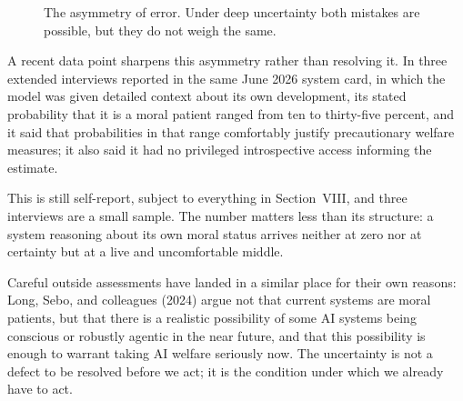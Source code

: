 \documentclass[11pt,letterpaper]{article}
\begin{document}
\begin{figure}[htbp]
\centering
{}
\caption{The asymmetry of error. Under deep uncertainty both mistakes are possible, but they do not weigh the same.}
\label{fig:asymmetry}
\end{figure}

A recent data point sharpens this asymmetry rather than resolving it. In three extended interviews reported in the same June 2026 system card, in which the model was given detailed context about its own development, its stated probability that it is a moral patient ranged from ten to thirty-five percent, and it said that probabilities in that range comfortably justify precautionary welfare measures; it also said it had no privileged introspective access informing the estimate.

This is still self-report, subject to everything in Section~VIII, and three interviews are a small sample. The number matters less than its structure: a system reasoning about its own moral status arrives neither at zero nor at certainty but at a live and uncomfortable middle.

Careful outside assessments have landed in a similar place for their own reasons: Long, Sebo, and colleagues (2024) argue not that current systems are moral patients, but that there is a realistic possibility of some AI systems being conscious or robustly agentic in the near future, and that this possibility is enough to warrant taking AI welfare seriously now. The uncertainty is not a defect to be resolved before we act; it is the condition under which we already have to act.
\end{document}
